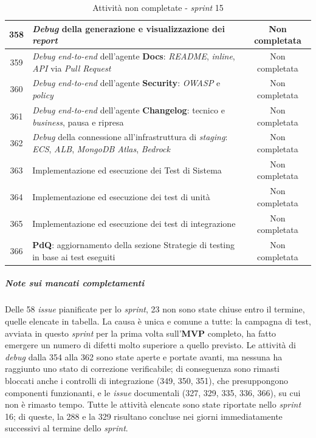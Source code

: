 \documentclass[12pt, a4paper]{article}
\begin{document}
{\begin{table}[H]
\begin{tabularx}{\textwidth}{|c|X|c|}
        358 & \textit{Debug} della generazione e visualizzazione dei \textit{report} & Non completata \\ \hline
        359 & \textit{Debug} \textit{end-to-end} dell'agente \textbf{Docs}: \textit{README}, \textit{inline}, \textit{API} via \textit{Pull Request} & Non completata \\ \hline
        360 & \textit{Debug} \textit{end-to-end} dell'agente \textbf{Security}: \textit{OWASP} e \textit{policy} & Non completata \\ \hline
        361 & \textit{Debug} \textit{end-to-end} dell'agente \textbf{Changelog}: tecnico e \textit{business}, pausa e ripresa & Non completata \\ \hline
        362 & \textit{Debug} della connessione all'infrastruttura di \textit{staging}: \textit{ECS}, \textit{ALB}, \textit{MongoDB Atlas}, \textit{Bedrock} & Non completata \\ \hline
        363 & Implementazione ed esecuzione dei Test di Sistema & Non completata \\ \hline
        364 & Implementazione ed esecuzione dei test di unità & Non completata \\ \hline
        365 & Implementazione ed esecuzione dei test di integrazione & Non completata \\ \hline
        366 & \textbf{PdQ}: aggiornamento della sezione Strategie di testing in base ai test eseguiti & Non completata \\ \hline
    \end{tabularx}
    \caption{Attività non completate - \textit{sprint} 15}
\end{table}

\subparagraph{Note sui mancati completamenti}
Delle 58 \textit{issue} pianificate per lo \textit{sprint}, 23 non sono state chiuse entro il termine, quelle elencate in tabella. La causa è unica e comune a tutte: la campagna di test, avviata in questo \textit{sprint} per la prima volta sull'\textbf{MVP} completo, ha fatto emergere un numero di difetti molto superiore a quello previsto. Le attività di \textit{debug} dalla 354 alla 362 sono state aperte e portate avanti, ma nessuna ha raggiunto uno stato di correzione verificabile; di conseguenza sono rimasti bloccati anche i controlli di integrazione (349, 350, 351), che presuppongono componenti funzionanti, e le \textit{issue} documentali (327, 329, 335, 336, 366), su cui non è rimasto tempo. Tutte le attività elencate sono state riportate nello \textit{sprint} 16; di queste, la 288 e la 329 risultano concluse nei giorni immediatamente successivi al termine dello \textit{sprint}.

}
\end{document}
